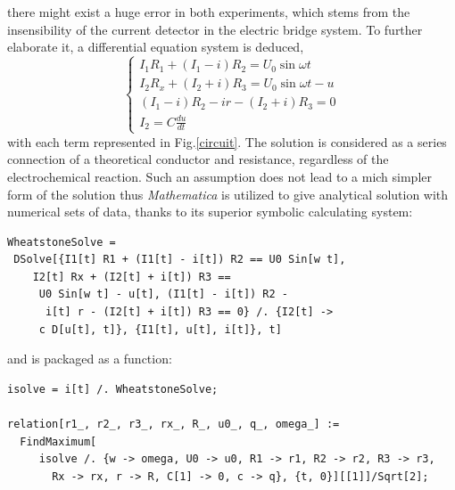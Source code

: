 \documentclass[%
 reprint,
 amsmath,amssymb,
 aps,
]{revtex4-1}
\begin{document}
there might exist a huge error in both experiments, which stems from the insensibility of the current detector in the electric bridge system. To further elaborate it, a differential equation system is deduced,
\begin{equation}
\begin{cases}
I_1 R_1 +(I_1 -i) R_2 = U_0 \sin{\omega t} \\
I_2 R_x + (I_2+i) R_3 = U_0 \sin{\omega t} - u \\
(I_1 -i) R_2 - i r - (I_2 + i) R_3 =0 \\
I_2 = C \frac{d u}{dt}
\end{cases}
\end{equation}
with each term represented in Fig.\ref{circuit}. The solution is considered as a series connection of a theoretical conductor and resistance, regardless of the electrochemical reaction. Such an assumption does not lead to a mich simpler form of the solution thus \emph{Mathematica} is utilized to give analytical solution with numerical sets of data, thanks to its superior symbolic calculating system:
\begin{lstlisting}
WheatstoneSolve = 
 DSolve[{I1[t] R1 + (I1[t] - i[t]) R2 == U0 Sin[w t], 
    I2[t] Rx + (I2[t] + i[t]) R3 == 
     U0 Sin[w t] - u[t], (I1[t] - i[t]) R2 - 
      i[t] r - (I2[t] + i[t]) R3 == 0} /. {I2[t] -> 
     c D[u[t], t]}, {I1[t], u[t], i[t]}, t]
\end{lstlisting}
and is packaged as a function:
\begin{lstlisting}
isolve = i[t] /. WheatstoneSolve;

relation[r1_, r2_, r3_, rx_, R_, u0_, q_, omega_] := 
  FindMaximum[
     isolve /. {w -> omega, U0 -> u0, R1 -> r1, R2 -> r2, R3 -> r3, 
       Rx -> rx, r -> R, C[1] -> 0, c -> q}, {t, 0}][[1]]/Sqrt[2];
\end{lstlisting}
\end{document}

